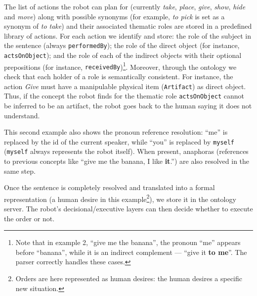 \documentclass{svmult}
\newcommand{\concept}[1]{{\footnotesize \texttt{#1}}}
\begin{document}
The list of actions the robot can plan for (currently \emph{take},
\emph{place}, \emph{give}, \emph{show}, \emph{hide} and \emph{move}) along with
possible synonyms (for example, \emph{to pick} is set as a synonym of \emph{to
take}) and their associated thematic roles are stored in a predefined library
of actions. For each action we identify and store: the role of the subject in
the sentence (always \concept{performedBy}); the role of the direct object
(for instance, \concept{actsOnObject}); and the role of each of the indirect
objects with their optional prepositions (for instance,
\concept{receivedBy})\footnote{Note that in example 2, ``give me the banana'',
the pronoun ``me'' appears before ``banana'', while it is an indirect
complement --- ``give it {\bf to me}''. The parser correctly handles these
cases.}. Moreover, through the ontology we check that each holder of a
role is semantically consistent. For instance, the action \emph{Give} must have a
manipulable physical item (\concept{Artifact}) as direct object. Thus, if the
concept the robot finds for the thematic role \concept{actsOnObject} cannot be
inferred to be an artifact, the robot goes back to the human saying it does not
understand.

This second example  also shows the pronoun reference resolution: ``me'' is
replaced by the id of the current speaker, while ``you'' is replaced by
\concept{myself} (\concept{myself} always represents the robot itself). When
present, anaphoras (references to previous concepts like ``give me the banana, I
like {\bf it}.'') are also resolved in the same step.

Once the sentence is completely resolved and translated into a formal
representation (a human desire in this example\footnote{Orders are here
represented as human desires: the human desires a specific new situation.}), we
store it in the ontology server. The robot's decisional/executive layers can
then decide whether to execute the order or not. 
\end{document}
